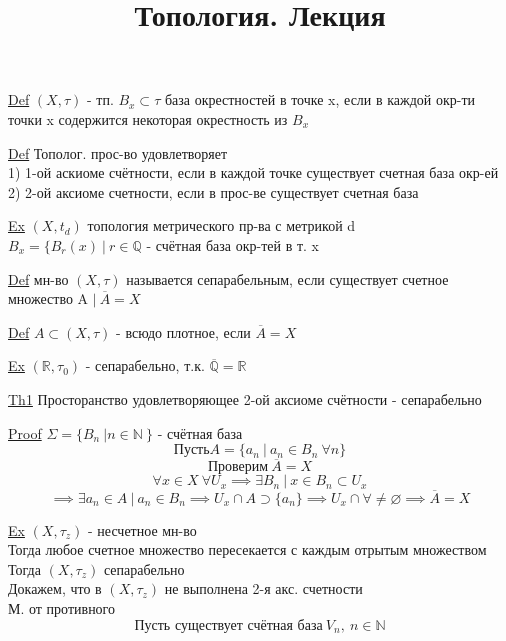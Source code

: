 \documentclass[a4paper]{article}
\begin{document}
\title{Топология. Лекция}
\maketitle

\begin{tcolorbox}
\underline{Def} $ (X, \tau) $ - тп. $ B_x \subset \tau $ база окрестностей в 
точке x, если в каждой окр-ти точки x содержится некоторая окрестность из $ B_x $ 
\end{tcolorbox}

\begin{tcolorbox}
\underline{Def} Тополог. прос-во удовлетворяет\\
1) 1-ой аскиоме счётности, если в каждой точке существует счетная база окр-ей\\
2) 2-ой аксиоме счетности, если в прос-ве существует счетная база
\end{tcolorbox}

\underline{Ex} $ (X, t_d) $ топология метрического пр-ва с метрикой d\\
$ B_x = \{ B_r(x) \ | \ r \in \mathbb{Q} $ - счётная база окр-тей в т. x 

\begin{tcolorbox}
\underline{Def} мн-во $ (X, \tau) $ называется сепарабельным, если
существует счетное множество A $ |\ \overline{A} = X $ 
\end{tcolorbox}

\begin{tcolorbox}
\underline{Def} $ A \subset (X, \tau) $ - всюдо плотное, если $ \overline{A} = X $ 
\end{tcolorbox}

\underline{Ex} $ (\mathbb{R}, \tau_0) $ - сепарабельно, т.к. $ \overline{\mathbb{Q}}
= \mathbb{R} $  

\begin{tcolorbox}
\underline{Th1} Просторанство удовлетворяющее 2-ой аксиоме счётности - сепарабельно

\underline{Proof} $ \Sigma = \{ B_n \ | n \in \mathbb{N} \ \} $ - счётная база
\[
    \text{Пусть} A = \{ a_n \ | \ a_n \in B_n \ \forall n \}
\]
\[
    \text{Проверим} \ \overline{A} = X
\]
\[
    \forall x \in X \ \forall U_x \implies \exists B_n\ | \ x \in B_n \subset U_x
\]
\[
    \implies \exists a_n \in A \ | \ a_n \in B_n \implies U_x \cap A \supset \{ 
    a_n \} \implies U_x \cap \forall \neq \varnothing \implies \overline{A} = X
\]
\end{tcolorbox}

\underline{Ex} $ (X, \tau_z) $ - несчетное мн-во\\
Тогда любое счетное множество пересекается с каждым отрытым множеством\\
Тогда $ (X, \tau_z) $ сепарабельно\\
Докажем, что в $ (X, \tau_z) $ не выполнена 2-я акс. счетности\\
М. от противного
\[
    \text{Пусть существует счётная база} \ V_n, \ n \in \mathbb{N}
\]
\end{document}
